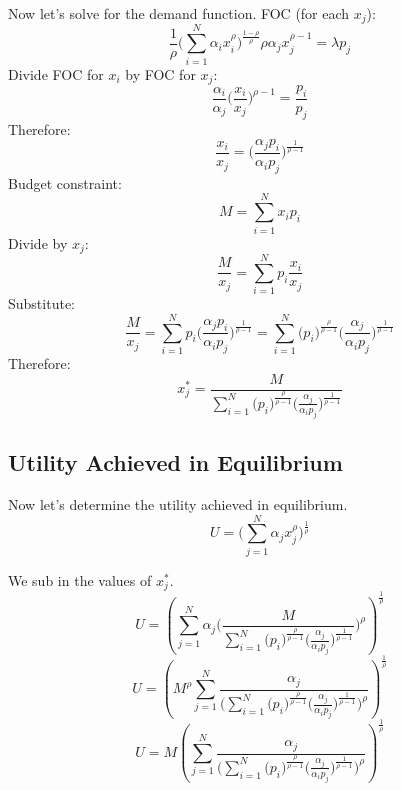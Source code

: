 \documentclass[letter, 12pt, epsf,leqno]{article}
\begin{document}
Now let's solve for the demand function.
FOC (for each $x_j$):
\begin{equation}\frac{1}{\rho}\Bigg(\sum_{i=1}^N \alpha_i x_i^\rho\Bigg)^\frac{1 - \rho}{\rho} \rho \alpha_j x_j^{\rho-1} = \lambda p_j\end{equation}
Divide FOC for $x_i$ by FOC for $x_j$:
\begin{equation}\frac{\alpha_i}{\alpha_j}\Bigg(\frac{x_i}{x_j}\Bigg)^{\rho-1} = \frac {p_i}{p_j}\end{equation}
Therefore:
\begin{equation}\frac{x_i}{x_j} = \Bigg( \frac {\alpha_j p_i}{\alpha_i p_j} \Bigg) ^\frac{1}{\rho-1}\end{equation}
Budget constraint:
\begin{equation}M =\sum_{i=1}^N x_i p_i\end{equation}
Divide by $x_j$:
\begin{equation}\frac{M}{x_j} =\sum_{i=1}^N p_i\frac{x_i}{x_j}\end{equation}
Substitute:
\begin{equation}\frac{M}{x_j} =\sum_{i=1}^N p_i \Bigg( \frac {\alpha_j p_i}{\alpha_i p_j} \Bigg) ^\frac{1}{\rho-1}  =\sum_{i=1}^N \Bigg(p_i\Bigg)^\frac{\rho}{\rho-1} \Bigg( \frac {\alpha_j }{\alpha_i p_j} \Bigg) ^\frac{1}{\rho-1}\end{equation}
Therefore:
\begin{equation}x_j^* =\frac{M}{\sum_{i=1}^N \Bigg(p_i\Bigg)^\frac{\rho}{\rho-1} \Bigg( \frac {\alpha_j }{\alpha_i p_j} \Bigg) ^\frac{1}{\rho-1}}\end{equation}

\subsection{Utility Achieved in Equilibrium}

Now let's determine the utility achieved in equilibrium.
\begin{equation}U = \Bigg(\sum_{j=1}^N \alpha_j x_j^\rho\Bigg)^\frac{1}{\rho}\end{equation}

We sub in the values of $x_j^*$.
\begin{equation}U = \left(\sum_{j=1}^N \alpha_j \Bigg(\frac{M}{\sum_{i=1}^N \Big(p_i\Big)^\frac{\rho}{\rho-1} \Big( \frac {\alpha_j }{\alpha_i p_j} \Big) ^\frac{1}{\rho-1}}\Bigg)^\rho\right)^\frac{1}{\rho} \end{equation}
\begin{equation}U =  \left(M^\rho \sum_{j=1}^N  \frac{\alpha_j}{\Bigg(\sum_{i=1}^N \Big(p_i\Big)^\frac{\rho}{\rho-1} \Big( \frac {\alpha_j }{\alpha_i p_j} \Big) ^\frac{1}{\rho-1}\Bigg)^\rho}\right)^\frac{1}{\rho} \end{equation}
\begin{equation}U =  M \left( \sum_{j=1}^N  \frac{\alpha_j}{\Bigg(\sum_{i=1}^N \Big(p_i\Big)^\frac{\rho}{\rho-1} \Big( \frac {\alpha_j }{\alpha_i p_j} \Big) ^\frac{1}{\rho-1}\Bigg)^\rho}\right)^\frac{1}{\rho} \end{equation}
\end{document}
